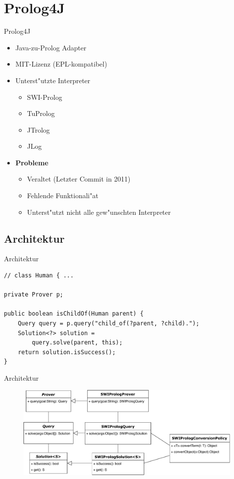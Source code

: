 \documentclass[18pt]{beamer}
\begin{document}
\section{Prolog4J}
\begin{frame}{Prolog4J}
\begin{itemize}
\item Java-zu-Prolog Adapter
\item MIT-Lizenz (EPL-kompatibel)
\item Unterst"utzte Interpreter
\begin{itemize}
\item SWI-Prolog
\item TuProlog
\item JTrolog
\item JLog
\end{itemize}
\vspace{0.3cm}
\item \textbf{Probleme}
\begin{itemize}
\item Veraltet (Letzter Commit in 2011)
\item Fehlende Funktionali"at
\item Unterst"utzt nicht alle gew"unschten Interpreter
\end{itemize}
\end{itemize}
\end{frame}
\subsection{Architektur}
\begin{frame}[fragile]{Architektur}
\begin{verbatim}
// class Human { ...

private Prover p;

public boolean isChildOf(Human parent) {
    Query query = p.query("child_of(?parent, ?child).");
    Solution<?> solution = 
        query.solve(parent, this);
    return solution.isSuccess();
}
\end{verbatim}
\end{frame}
\begin{frame}{Architektur}
\begin{figure}[h]
\centering
\includegraphics[width=1\textwidth]{prolog4j.pdf}
\end{figure}
\end{frame}
\end{document}
